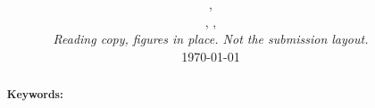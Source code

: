 \documentclass[11pt,a4paper]{article}
\title{\textbf{\projtitle}}
\author{\projauthorlist}
\date{\projaffildiv,\\
	\projaffilorg, \projaffilcity, \projaffilcountry\\[0.6em]
	\textit{Reading copy, figures in place. Not the submission layout.}\\
	\today}
\begin{document}
\maketitle

\begin{abstract}


\medskip\noindent\textbf{Keywords:} 
\end{abstract}







\end{document}
